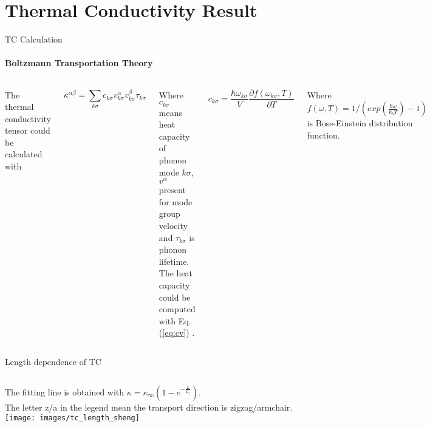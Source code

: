 \documentclass{beamer}
\begin{document}
\section{Thermal Conductivity Result}

\begin{frame}{TC Calculation}
  \framesubtitle{Boltzmann Transportation Theory}%

  \begin{columns}[onlytextwidth]
    The thermal conductivity tensor could be calculated with

    \begin{equation}
      \kappa^{\alpha\beta} = \sum_{k \sigma}{c_{k \sigma}v^{\alpha}_{k \sigma}v^{\beta}_{k \sigma}\tau_{k \sigma}} \label{eq:kappasum}
    \end{equation}

    Where $c_{k \sigma}$ means heat capacity of phonon mode $k \sigma$, $v^{\alpha}$ present for mode group velocity and $\tau_{k \sigma}$ is phonon lifetime. The heat capacity  could be computed with Eq.(\ref{eq:cv}) .

    \begin{equation}
      c_{k \sigma}=\frac{\hbar \omega_{k \sigma} }{V} \frac{\partial f(\omega_{k \sigma},T)}{\partial T} \label{eq:cv}
    \end{equation}

    Where $ f(\omega,T)=1/(exp(\frac{\hbar \omega}{k_b T})-1)$ is Bose-Einstein distribution function.


  \end{columns}

\end{frame}


\begin{frame}{Length dependence of TC}
  \begin{columns}[onlytextwidth]
    The fitting line is obtained with $\kappa = \kappa_\infty (1-e^{-\frac{L}{L_c}})$. \\
    The letter z/a in the legend mean the transport direction is zigzag/armchair.
    \texttt{[image: images/tc\_length\_sheng]}


  \end{columns}

\end{frame}
\end{document}
